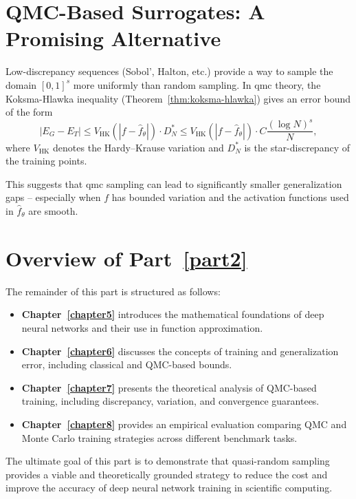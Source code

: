 \section{QMC-Based Surrogates: A Promising Alternative}
Low-discrepancy sequences (Sobol', Halton, etc.) provide a way to sample the
domain $[0,1]^s$ more uniformly than random sampling. In \acl{qmc} theory, the Koksma-Hlawka inequality (Theorem~\ref{thm:koksma-hlawka}) gives an error bound of the form
\begin{equation*}
|E_G - E_T| \leq V_{\mathrm{HK}}(|f - \hat{f}_\theta|) \cdot D^*_N \leq  V_{\mathrm{HK}}(|f - \hat{f}_\theta|) \cdot C \frac{(\log N)^s}{N},
\end{equation*}
where $V_{\mathrm{HK}}$ denotes the Hardy--Krause variation and $D^*_N$ is the
star-discrepancy of the training points.

This suggests that \ac{qmc} sampling can lead to significantly smaller generalization
gaps -- especially when $f$ has bounded variation and the activation functions used
in $\hat{f}_\theta$ are smooth.

\section{Overview of Part~\ref{part2}} The remainder of this part is structured
as follows:
\begin{itemize}
  \item \textbf{Chapter~\ref{chapter5}} introduces the mathematical foundations
  of deep neural networks and their use in function approximation.
  \item \textbf{Chapter~\ref{chapter6}} discusses the concepts of training and
  generalization error, including classical and QMC-based bounds.
  \item \textbf{Chapter~\ref{chapter7}} presents the theoretical analysis of
  QMC-based training, including discrepancy, variation, and convergence
  guarantees.
  \item \textbf{Chapter~\ref{chapter8}} provides an empirical evaluation
  comparing QMC and Monte Carlo training strategies across different benchmark
  tasks.
\end{itemize}

The ultimate goal of this part is to demonstrate that quasi-random sampling
provides a viable and theoretically grounded strategy to reduce the cost and
improve the accuracy of deep neural network training in scientific computing.


